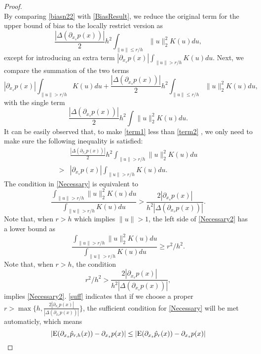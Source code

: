 \documentclass[aos,preprint]{imsart}
\theoremstyle{remark}
\begin{document}
\begin{appendix}
\begin{proof}
\[\] 
By comparing \eqref{biasn22} with \eqref{BiasResult}, we reduce the original term for the upper bound of bias
to the locally restrict version as
\[
\frac{|\Delta(\partial_{x_s}p(x))|}{2} h^2 \int_{\|u\|\leq r/h } \|u\|_2^2 K(u) du,
\] 
except for introducing an extra term $|\partial_{x_s} p(x)| \int_{\|u\|> r/h} K(u) du$. 
Next, we compare the summation of the two terms 
\begin{equation}\label{term1}
|\partial_{x_s} p(x)| \int_{\|u\|> r/h} K(u) du+ \frac{|\Delta(\partial_{x_s}p(x))|}{2} h^2 \int_{\|u\|\leq r/h } \|u\|_2^2 K(u) du,
\end{equation}
with the single term
\begin{equation}\label{term2}
\frac{|\Delta(\partial_{x_s}p(x))|}{2} h^2 \int \|u\|_2^2 K(u) du.
\end{equation}
It can be easily observed that, to make \eqref{term1} less than \eqref{term2} , we only need to make sure the following inequality is satisfied:
\begin{equation}\label{Necessary}
\begin{aligned}
&\frac{|\Delta(\partial_{x_s} p(x))|}{2} h^2 \int_{\|u\|> r /h} \|u\|_2^2 K(u) du\\
 >& |\partial_{x_s} p(x)| \int_{\|u\|> r/h} K(u) du.
\end{aligned}
\end{equation}
The condition in \eqref{Necessary} is equivalent to
\begin{equation}\label{Necessary2}
\frac{\int_{\|u\|> r /h} \|u\|_2^2 K(u) du }{\int_{\|u\|> r/h} K(u) du} > \frac{2|\partial_{x_s} p(x)| }{h^2 |\Delta(\partial_{x_s} p(x))|}.
\end{equation}
Note that, when $r>h$ which implies $\|u\|>1$,  the left side of \eqref{Necessary2} has a lower bound as
\begin{equation}\label{necess2}
\frac{ \int_{\|u\|> r /h} \|u\|_2^2 K(u) du}{ \int_{\|u\|> r/h} K(u) du}\geq r^2/h^2.
\end{equation}
Note that, when $r>h$, the condition
\begin{equation}\label{suff}
r^2/h^2 > \frac{2|\partial_{x_s} p(x)| }{h^2 |\Delta(\partial_{x_s} p(x))|} ,
\end{equation}
implies \eqref{Necessary2}. \eqref{suff} indicates that if we choose a proper $r>\max\{h,\frac{2|\partial_{x_s} p(x)|}{ |\Delta(\partial_{x_s} p(x))|}\}$, the sufficient  condition for \eqref{Necessary} will be met automaticly, which means
\begin{equation}\label{end1}
|{\rm E}( \partial_{x_s}  \hat{p}_{r,h}(x)) -  \partial_{x_s } p(x)| \leq |{\rm E}( \partial_{x_s}  \hat{p}_{r}(x)) -  \partial_{x_s } p(x)|
\end{equation}


\end{proof}
\end{appendix}
\end{document}
